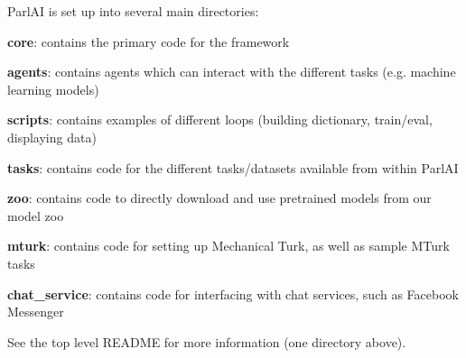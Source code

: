 Parl\+AI is set up into several main directories\+:


\begin{DoxyItemize}
\item {\bfseries core}\+: contains the primary code for the framework
\item {\bfseries agents}\+: contains agents which can interact with the different tasks (e.\+g. machine learning models)
\item {\bfseries scripts}\+: contains examples of different loops (building dictionary, train/eval, displaying data)
\item {\bfseries tasks}\+: contains code for the different tasks/datasets available from within Parl\+AI
\item {\bfseries zoo}\+: contains code to directly download and use pretrained models from our model zoo
\item {\bfseries mturk}\+: contains code for setting up Mechanical Turk, as well as sample M\+Turk tasks
\item {\bfseries chat\+\_\+service}\+: contains code for interfacing with chat services, such as Facebook Messenger
\end{DoxyItemize}

See the top level R\+E\+A\+D\+ME for more information (one directory above). 
